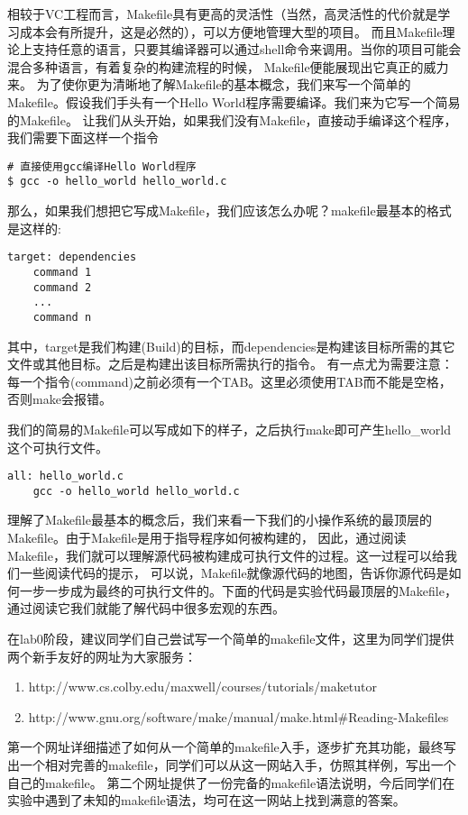 相较于VC工程而言，Makefile具有更高的灵活性（当然，高灵活性的代价就是学习成本会有所提升，这是必然的），可以方便地管理大型的项目。 而且Makefile理论上支持任意的语言，只要其编译器可以通过shell命令来调用。当你的项目可能会混合多种语言，有着复杂的构建流程的时候， Makefile便能展现出它真正的威力来。
为了使你更为清晰地了解Makefile的基本概念，我们来写一个简单的Makefile。假设我们手头有一个Hello World程序需要编译。我们来为它写一个简易的Makefile。 让我们从头开始，如果我们没有Makefile，直接动手编译这个程序，我们需要下面这样一个指令
\begin{verbatim}
# 直接使用gcc编译Hello World程序
$ gcc -o hello_world hello_world.c
\end{verbatim}
那么，如果我们想把它写成Makefile，我们应该怎么办呢？makefile最基本的格式是这样的:
\begin{verbatim}
target: dependencies
    command 1
    command 2
    ...
    command n
\end{verbatim}
其中，target是我们构建(Build)的目标，而dependencies是构建该目标所需的其它文件或其他目标。之后是构建出该目标所需执行的指令。 有一点尤为需要注意：每一个指令(command)之前必须有一个TAB。这里必须使用TAB而不能是空格，否则make会报错。

我们的简易的Makefile可以写成如下的样子，之后执行make即可产生hello\_world这个可执行文件。
\begin{verbatim}
all: hello_world.c
    gcc -o hello_world hello_world.c
\end{verbatim}
理解了Makefile最基本的概念后，我们来看一下我们的小操作系统的最顶层的Makefile。由于Makefile是用于指导程序如何被构建的， 因此，通过阅读Makefile，我们就可以理解源代码被构建成可执行文件的过程。这一过程可以给我们一些阅读代码的提示， 可以说，Makefile就像源代码的地图，告诉你源代码是如何一步一步成为最终的可执行文件的。下面的代码是实验代码最顶层的Makefile， 通过阅读它我们就能了解代码中很多宏观的东西。

在lab0阶段，建议同学们自己尝试写一个简单的makefile文件，这里为同学们提供两个新手友好的网址为大家服务：
\begin{enumerate}
  \item http://www.cs.colby.edu/maxwell/courses/tutorials/maketutor
  \item http://www.gnu.org/software/make/manual/make.html\#Reading-Makefiles
\end{enumerate}
第一个网址详细描述了如何从一个简单的makefile入手，逐步扩充其功能，最终写出一个相对完善的makefile，同学们可以从这一网站入手，仿照其样例，写出一个自己的makefile。
第二个网址提供了一份完备的makefile语法说明，今后同学们在实验中遇到了未知的makefile语法，均可在这一网站上找到满意的答案。




